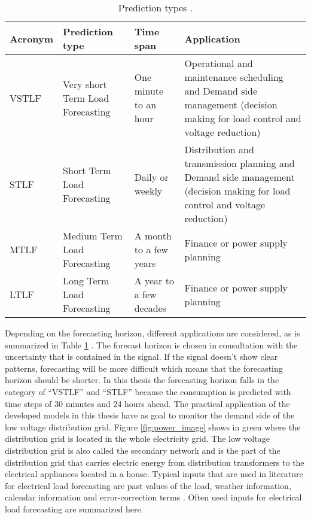 \begin{table}[h!]
	\centering
	\begin{tabular}{@{}lp{3cm}p{3cm}p{4.5cm}@{}} \toprule
		\textbf{Acronym}	& \textbf{Prediction type} & \textbf{Time span} & \textbf{Application}\\\midrule
		VSTLF	& Very short Term Load Forecasting	& One minute to an hour	& Operational and maintenance
		scheduling and Demand side management
		(decision making for load
		control and voltage reduction)\\\hline		
		STLF	&	Short Term Load Forecasting 	& 	Daily or weekly		& Distribution and transmission
		planning and Demand side management
		(decision making for load
		control and voltage reduction)\\\hline	
		MTLF	&	Medium Term Load Forecasting	& A month to a few years	& Finance or power supply planning\\\hline
		LTLF	&	Long Term Load Forecasting	&	A year to a few decades	&	Finance or power supply planning\\\bottomrule
	\end{tabular}
	\caption{Prediction types \cite{NarjesFallah2018}.}
	\label{tab:prediciontypes}
\end{table}

Depending on the forecasting horizon, different applications are considered, as is summarized in Table \ref{tab:prediciontypes} \cite{NarjesFallah2018}. The forecast horizon is chosen in consultation with the uncertainty that is contained in the signal. If the signal doesn't show clear patterns, forecasting will be more difficult which means that the forecasting horizon should be shorter. In this thesis the forecasting horizon falls in the category of ``VSTLF'' and ``STLF'' because the consumption is predicted with time steps of 30 minutes and 24 hours ahead. The practical application of the developed models in this thesis have as goal to monitor the demand side of the low voltage distribution grid. Figure \ref{fig:power_image} shows in green where the distribution grid is located in the whole electricity grid. The low voltage distribution grid is also called the secondary network and is the part of the distribution grid that carries electric energy from distribution transformers to the electrical appliances located in a house. Typical inputs that are used in literature for electrical load forecasting are past values of the load, weather information, calendar information and error-correction terms \cite{loadforecastingmoor}. Often used inputs for electrical load forecasting are summarized here.

